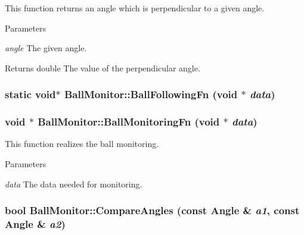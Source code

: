 This function returns an angle which is perpendicular to a given angle. 


\begin{DoxyParams}{Parameters}
\item[{\em angle}]The given angle. \end{DoxyParams}
\begin{DoxyReturn}{Returns}
double The value of the perpendicular angle. 
\end{DoxyReturn}
\hypertarget{classBallMonitor_a2ca3e25f437b5aabb3bc88e0f84cf9a5}{
\subsubsection[{BallFollowingFn}]{\setlength{\rightskip}{0pt plus 5cm}static void$\ast$ BallMonitor::BallFollowingFn (void $\ast$ {\em data})}}
\label{classBallMonitor_a2ca3e25f437b5aabb3bc88e0f84cf9a5}
\hypertarget{classBallMonitor_af76da8bc13e92d9083a9a77469c472df}{
\subsubsection[{BallMonitoringFn}]{\setlength{\rightskip}{0pt plus 5cm}void $\ast$ BallMonitor::BallMonitoringFn (void $\ast$ {\em data})}}
\label{classBallMonitor_af76da8bc13e92d9083a9a77469c472df}


This function realizes the ball monitoring. 


\begin{DoxyParams}{Parameters}
\item[{\em data}]The data needed for monitoring. \end{DoxyParams}
\hypertarget{classBallMonitor_a78114ec7fc20317f84491e428dd8c126}{
\subsubsection[{CompareAngles}]{\setlength{\rightskip}{0pt plus 5cm}bool BallMonitor::CompareAngles (const {\bf Angle} \& {\em a1}, \/  const {\bf Angle} \& {\em a2})}}
\label{classBallMonitor_a78114ec7fc20317f84491e428dd8c126}


